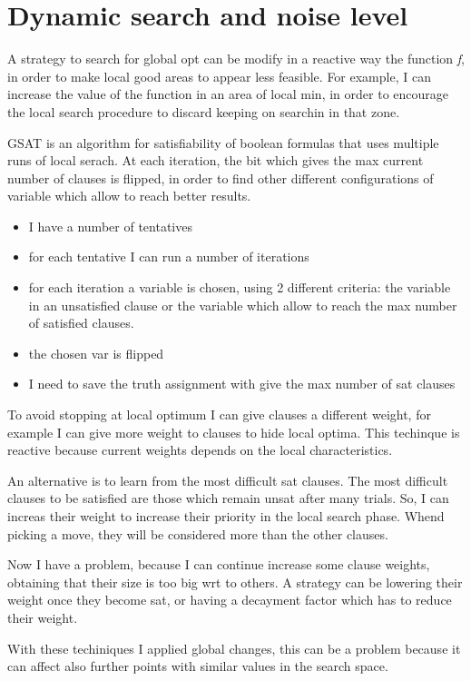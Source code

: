 \documentclass[11pt]{article}
\begin{document}
\section{Dynamic search and noise level}
A strategy to search for global opt can be modify in a reactive way the function \textit{f}, in order to make local good areas to appear less feasible. For example, I can increase the value of the function in an area of local min, in order to encourage the local search procedure to discard keeping on searchin in that zone. 

GSAT is an algorithm for satisfiability of boolean formulas that uses multiple runs of local serach. At each iteration, the bit which gives the max current number of clauses is flipped, in order to find other different configurations of variable which allow to reach better results. 

\begin{itemize}
\item I have a number of tentatives
\item for each tentative I can run a number of iterations
\item for each iteration a variable is chosen, using 2 different criteria: the variable in an unsatisfied clause or the variable which allow to reach the max number of satisfied clauses. 
\item the chosen var is flipped
\item I need to save the truth assignment with give the max number of sat clauses
\end{itemize}

To avoid stopping at local optimum I can give clauses a different weight, for example I can give more weight to clauses to hide local optima. This techinque is reactive because current weights depends on the local characteristics. 

An alternative is to learn from the most difficult sat clauses. The most difficult clauses to be satisfied are those which remain unsat after many trials. So, I can increas their weight to increase their priority in the local search phase. Whend picking a move, they will be considered more than the other clauses. 

Now I have a problem, because I can continue increase some clause weights, obtaining that their size is too big wrt to others. A strategy can be lowering their weight once they become sat, or having a decayment factor which has to reduce their weight. 

With these techiniques I applied global changes, this can be a problem because it can affect also further points with similar values in the search space.
\end{document}
